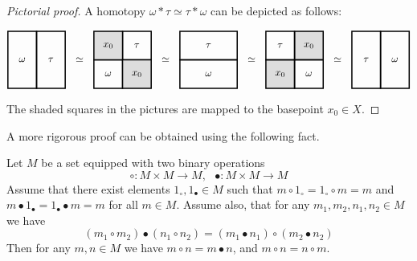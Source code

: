 \begin{proof}[Pictorial proof]
A homotopy $\omega\ast\tau \simeq \tau\ast\omega$ can be depicted as follows:

\begin{equation*}
\begin{tikzpicture}
\draw[very thick] (0,0) rectangle  node[anchor=center] {$\omega$} (1,2);
\draw[very thick] (1,0) rectangle node[anchor=center] {$\tau$}(2,2);
\node at (2.5,1) {$\simeq$};
\draw[very thick] (3,0) rectangle  node[anchor=center] {$\omega$} (4,1);
\draw[very thick] (4,1) rectangle node[anchor=center] {$\tau$}(5,2);
\draw[very thick, fill=mygray2] (3,1) rectangle node[anchor=center] {$x_{0}$}(4,2);
\draw[very thick,  fill=mygray2] (4,0) rectangle node[anchor=center] {$x_{0}$}(5,1);
\node at (5.5,1) {$\simeq$};
\draw[very thick] (6,0) rectangle  node[anchor=center] {$\omega$} (8,1);
\draw[very thick] (6,1) rectangle node[anchor=center] {$\tau$}(8,2);
\node at (8.5,1) {$\simeq$};
\draw[very thick,  fill=mygray2] (9,0) rectangle  node[anchor=center] {$x_{0}$} (10,1);
\draw[very thick,  fill=mygray2] (10,1) rectangle node[anchor=center] {$x_{0}$}(11,2);
\draw[very thick] (9,1) rectangle node[anchor=center] {$\tau$}(10,2);
\draw[very thick] (10,0) rectangle node[anchor=center] {$\omega$}(11,1);
\node at (11.5,1) {$\simeq$};
\draw[very thick] (12,0) rectangle  node[anchor=center] {$\tau$} (13,2);
\draw[very thick] (13,0) rectangle node[anchor=center] {$\omega$}(14,2);
\end{tikzpicture}
\end{equation*}
The shaded squares in the pictures are mapped to the basepoint $x_{0}\in X$.
\end{proof}

A more rigorous proof can be obtained using the following fact.

\begin{ECKMAN-HILTON THM}
\label{ECKMANHILTON THM}
Let $M$ be a set equipped with two binary operations
\[\circ \colon M \times M \to M, \ \ \ \bullet \colon M \times M \to M\]
Assume that there  exist elements $1_{\circ}, 1_{\bullet} \in M$ such that 
$m \circ 1_{\circ} =  1_{\circ}\circ m = m$ and 
$m \bullet 1_{\bullet} =  1_{\bullet}\bullet m = m$
for all $m\in M$. Assume also, that for any $m_{1}, m_{2}, n_{1}, n_{2}\in M$ we have
\[
(m_{1}\circ m_{2}) \bullet (n_{1}\circ n_{2}) = 
(m_{1}\bullet n_{1})\circ (m_{2}\bullet n_{2})
\]
Then for any $m, n\in M$ we have $m\circ n = m\bullet n$, and $m\circ n = n \circ m$.
\end{ECKMAN-HILTON THM}

